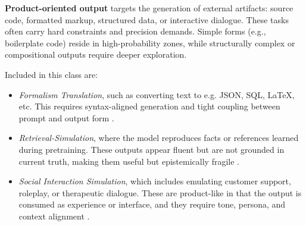\documentclass[12pt]{article}
\theoremstyle{definition}
\begin{document}
\textbf{Product-oriented output} targets the generation of external artifacts: source code, formatted markup, structured data, or interactive dialogue. These tasks often carry hard constraints and precision demands. Simple forms (e.g., boilerplate code) reside in high-probability zones, while structurally complex or compositional outputs require deeper exploration.

Included in this class are:
\begin{itemize}
  \item \emph{Formalism Translation}, such as converting text to e.g. JSON, SQL,  \LaTeX, etc. This requires syntax-aligned generation and tight coupling between prompt and output form \parencite{reynolds2021prompt}.
  \item \emph{Retrieval-Simulation}, where the model reproduces facts or references learned during pretraining. These outputs appear fluent but are not grounded in current truth, making them useful but epistemically fragile \parencite{bommasani2021opportunities}.
  \item \emph{Social Interaction Simulation}, which includes emulating customer support, roleplay, or therapeutic dialogue. These are product-like in that the output is consumed as experience or interface, and they require tone, persona, and context alignment \parencite{jo2025proxyllm, park2023generative, song2024typing}.
\end{itemize}


\end{document}
